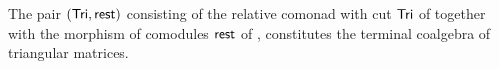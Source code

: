 \documentclass[envcountsame]{llncs}
\begin{document}
\begin{theorem}\label{ex:final_sem_tri} 
   The pair $(\mathsf{Tri}, \mathsf{rest})$ consisting of the relative comonad with cut $\mathsf{Tri}$ of  together with 
    the morphism of comodules $\mathsf{rest}$ of ,
   constitutes the terminal coalgebra of triangular matrices.
\end{theorem}







 
\printbibliography


\appendix




\end{document}
